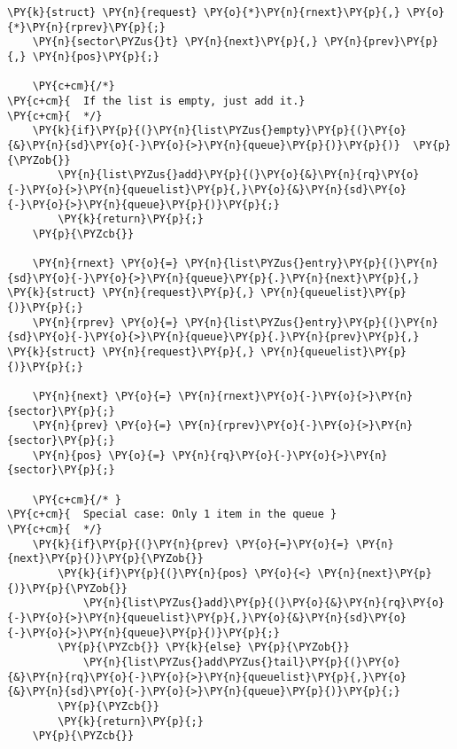 \begin{Verbatim}[commandchars=\\\{\}]
	\PY{k}{struct} \PY{n}{request} \PY{o}{*}\PY{n}{rnext}\PY{p}{,} \PY{o}{*}\PY{n}{rprev}\PY{p}{;}
	\PY{n}{sector\PYZus{}t} \PY{n}{next}\PY{p}{,} \PY{n}{prev}\PY{p}{,} \PY{n}{pos}\PY{p}{;}

	\PY{c+cm}{/*}
\PY{c+cm}{	If the list is empty, just add it.}
\PY{c+cm}{	*/}
	\PY{k}{if}\PY{p}{(}\PY{n}{list\PYZus{}empty}\PY{p}{(}\PY{o}{&}\PY{n}{sd}\PY{o}{-}\PY{o}{>}\PY{n}{queue}\PY{p}{)}\PY{p}{)}  \PY{p}{\PYZob{}}
		\PY{n}{list\PYZus{}add}\PY{p}{(}\PY{o}{&}\PY{n}{rq}\PY{o}{-}\PY{o}{>}\PY{n}{queuelist}\PY{p}{,}\PY{o}{&}\PY{n}{sd}\PY{o}{-}\PY{o}{>}\PY{n}{queue}\PY{p}{)}\PY{p}{;}
		\PY{k}{return}\PY{p}{;}
	\PY{p}{\PYZcb{}}

	\PY{n}{rnext} \PY{o}{=} \PY{n}{list\PYZus{}entry}\PY{p}{(}\PY{n}{sd}\PY{o}{-}\PY{o}{>}\PY{n}{queue}\PY{p}{.}\PY{n}{next}\PY{p}{,} \PY{k}{struct} \PY{n}{request}\PY{p}{,} \PY{n}{queuelist}\PY{p}{)}\PY{p}{;}
	\PY{n}{rprev} \PY{o}{=} \PY{n}{list\PYZus{}entry}\PY{p}{(}\PY{n}{sd}\PY{o}{-}\PY{o}{>}\PY{n}{queue}\PY{p}{.}\PY{n}{prev}\PY{p}{,} \PY{k}{struct} \PY{n}{request}\PY{p}{,} \PY{n}{queuelist}\PY{p}{)}\PY{p}{;}
	
	\PY{n}{next} \PY{o}{=} \PY{n}{rnext}\PY{o}{-}\PY{o}{>}\PY{n}{sector}\PY{p}{;}
	\PY{n}{prev} \PY{o}{=} \PY{n}{rprev}\PY{o}{-}\PY{o}{>}\PY{n}{sector}\PY{p}{;}
	\PY{n}{pos} \PY{o}{=} \PY{n}{rq}\PY{o}{-}\PY{o}{>}\PY{n}{sector}\PY{p}{;}

	\PY{c+cm}{/* }
\PY{c+cm}{	Special case: Only 1 item in the queue }
\PY{c+cm}{	*/}
	\PY{k}{if}\PY{p}{(}\PY{n}{prev} \PY{o}{=}\PY{o}{=} \PY{n}{next}\PY{p}{)}\PY{p}{\PYZob{}}
		\PY{k}{if}\PY{p}{(}\PY{n}{pos} \PY{o}{<} \PY{n}{next}\PY{p}{)}\PY{p}{\PYZob{}}
			\PY{n}{list\PYZus{}add}\PY{p}{(}\PY{o}{&}\PY{n}{rq}\PY{o}{-}\PY{o}{>}\PY{n}{queuelist}\PY{p}{,}\PY{o}{&}\PY{n}{sd}\PY{o}{-}\PY{o}{>}\PY{n}{queue}\PY{p}{)}\PY{p}{;}
		\PY{p}{\PYZcb{}} \PY{k}{else} \PY{p}{\PYZob{}}
			\PY{n}{list\PYZus{}add\PYZus{}tail}\PY{p}{(}\PY{o}{&}\PY{n}{rq}\PY{o}{-}\PY{o}{>}\PY{n}{queuelist}\PY{p}{,}\PY{o}{&}\PY{n}{sd}\PY{o}{-}\PY{o}{>}\PY{n}{queue}\PY{p}{)}\PY{p}{;}
		\PY{p}{\PYZcb{}}
		\PY{k}{return}\PY{p}{;}
	\PY{p}{\PYZcb{}}


\end{Verbatim}
